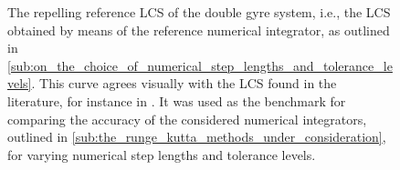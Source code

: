 \begin{figure}[htpb]
    \centering
    
    \caption[The repelling reference LCS of the double gyre system]{The
    repelling reference LCS of the double gyre system, i.e., the LCS obtained
    by means of the reference numerical integrator, as outlined in
    \cref{sub:on_the_choice_of_numerical_step_lengths_and_tolerance_levels}.
    This curve agrees visually with the LCS found in the literature, for
    instance in \textcite{farazmand2012computing}. It was used as the benchmark
    for comparing the accuracy of the considered numerical integrators,
    outlined in \cref{sub:the_runge_kutta_methods_under_consideration}, for
    varying numerical step lengths and tolerance levels.}
    \label{fig:referencelcs}
\end{figure}
